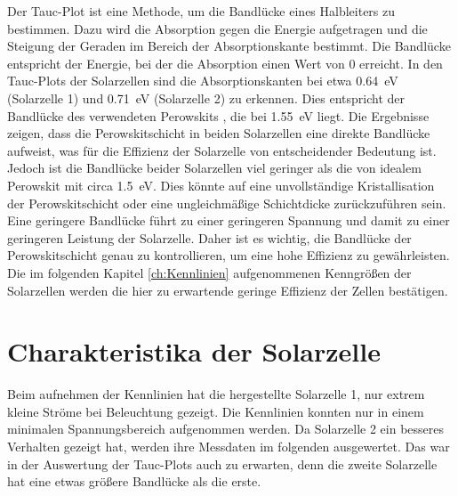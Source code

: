 \documentclass[12pt,a4paper,ngerman]{report}
\begin{document}
		Der Tauc-Plot ist eine Methode, um die Bandlücke eines Halbleiters zu bestimmen. Dazu wird die Absorption gegen die Energie aufgetragen und die Steigung der Geraden im Bereich der Absorptionskante bestimmt. Die Bandlücke entspricht der Energie, bei der die Absorption einen Wert von 0 erreicht. In den Tauc-Plots der Solarzellen sind die Absorptionskanten bei etwa \SI{0,64}{\eV} (Solarzelle 1) und \SI{0,71}{\eV} (Solarzelle 2) zu erkennen. Dies entspricht der Bandlücke des verwendeten Perowskits , die bei \SI{1.55}{\eV} liegt. Die Ergebnisse zeigen, dass die Perowskitschicht in beiden Solarzellen eine direkte Bandlücke aufweist, was für die Effizienz der Solarzelle von entscheidender Bedeutung ist. Jedoch ist die Bandlücke beider Solarzellen viel geringer als die von idealem Perowskit mit circa \SI{1.5}{\eV}. Dies könnte auf eine unvollständige Kristallisation der Perowskitschicht oder eine ungleichmäßige Schichtdicke zurückzuführen sein. Eine geringere Bandlücke führt zu einer geringeren Spannung und damit zu einer geringeren Leistung der Solarzelle. Daher ist es wichtig, die Bandlücke der Perowskitschicht genau zu kontrollieren, um eine hohe Effizienz zu gewährleisten. Die im folgenden Kapitel \ref{ch:Kennlinien} aufgenommenen Kenngrößen der Solarzellen werden die hier zu erwartende geringe Effizienz der Zellen bestätigen.

\section{Charakteristika der Solarzelle}
Beim aufnehmen der Kennlinien hat die hergestellte Solarzelle 1, nur extrem kleine Ströme bei Beleuchtung gezeigt. Die Kennlinien konnten nur in einem minimalen Spannungsbereich aufgenommen werden. Da Solarzelle 2 ein besseres Verhalten gezeigt hat, werden ihre Messdaten im folgenden ausgewertet. Das war in der Auswertung der Tauc-Plots auch zu erwarten, denn die zweite Solarzelle hat eine etwas größere Bandlücke als die erste. \\
\end{document}
